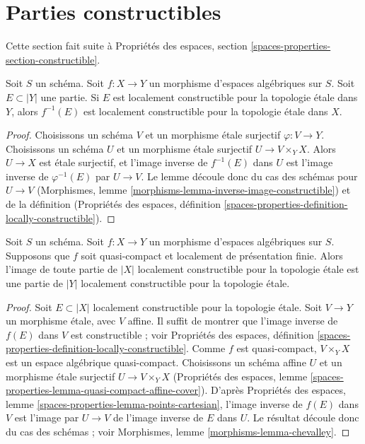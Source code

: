 \section{Parties constructibles}
\label{section-constructible}

\noindent
Cette section fait suite à
Propriétés des espaces, section \ref{spaces-properties-section-constructible}.

\begin{lemma}
\label{lemma-inverse-image-constructible}
Soit $S$ un schéma.
Soit $f : X \to Y$ un morphisme d'espaces algébriques sur $S$.
Soit $E \subset |Y|$ une partie.
Si $E$ est localement constructible pour la topologie étale dans $Y$, alors
$f^{-1}(E)$ est localement constructible pour la topologie étale dans $X$.
\end{lemma}

\begin{proof}
Choisissons un schéma $V$ et un morphisme étale surjectif $\varphi : V \to Y$.
Choisissons un schéma $U$ et un morphisme étale surjectif
$U \to V \times_Y X$. Alors $U \to X$ est étale surjectif,
et l'image inverse de $f^{-1}(E)$ dans $U$ est l'image
inverse de $\varphi^{-1}(E)$ par $U \to V$. Le lemme découle donc
du cas des schémas pour $U \to V$
(Morphismes, lemme \ref{morphisms-lemma-inverse-image-constructible})
et de la définition (Propriétés des espaces, définition
\ref{spaces-properties-definition-locally-constructible}).
\end{proof}

\begin{theorem}
\label{theorem-chevalley}
Soit $S$ un schéma.
Soit $f : X \to Y$ un morphisme d'espaces algébriques sur $S$.
Supposons que $f$ soit quasi-compact et localement de présentation finie.
Alors l'image de toute partie de $|X|$ localement constructible pour la topologie étale est
une partie de $|Y|$ localement constructible pour la topologie étale.
\end{theorem}

\begin{proof}
Soit $E \subset |X|$ localement constructible pour la topologie étale.
Soit $V \to Y$ un morphisme étale, avec $V$ affine.
Il suffit de montrer que l'image inverse de $f(E)$ dans
$V$ est constructible ; voir Propriétés des espaces, définition
\ref{spaces-properties-definition-locally-constructible}.
Comme $f$ est quasi-compact, $V \times_Y X$ est un espace algébrique quasi-compact.
Choisissons un schéma affine $U$ et un morphisme étale surjectif
$U \to V \times_Y X$ (Propriétés des espaces, lemme
\ref{spaces-properties-lemma-quasi-compact-affine-cover}).
D'après Propriétés des espaces, lemme \ref{spaces-properties-lemma-points-cartesian},
l'image inverse de $f(E)$ dans $V$ est l'image par $U \to V$
de l'image inverse de $E$ dans $U$.
Le résultat découle donc du cas des schémas ; voir
Morphismes, lemme \ref{morphisms-lemma-chevalley}.
\end{proof}







